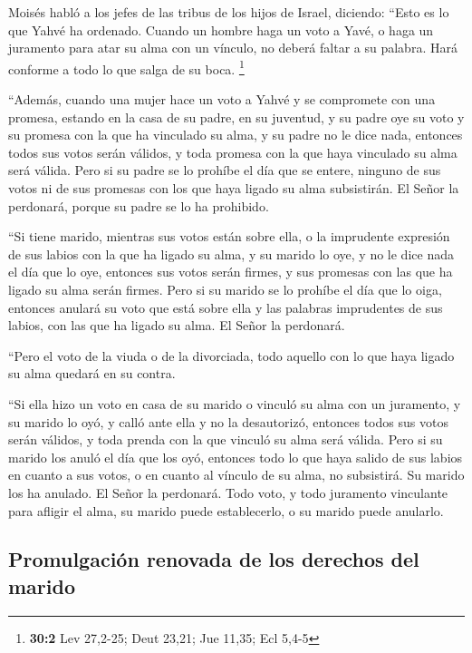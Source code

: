 \begin{paracol}{2}
 Moisés habló a los jefes de las tribus de los hijos de
Israel, diciendo: ``Esto es lo que Yahvé ha ordenado. 
Cuando un hombre haga un voto a Yavé, o haga un juramento para atar su
alma con un vínculo, no deberá faltar a su palabra. Hará conforme a todo
lo que salga de su boca. \footnote{\textbf{30:2} Lev 27,2-25; Deut
  23,21; Jue 11,35; Ecl 5,4-5}

 ``Además, cuando una mujer hace un voto a Yahvé y se
compromete con una promesa, estando en la casa de su padre, en su
juventud,  y su padre oye su voto y su promesa con la que
ha vinculado su alma, y su padre no le dice nada, entonces todos sus
votos serán válidos, y toda promesa con la que haya vinculado su alma
será válida.  Pero si su padre se lo prohíbe el día que se
entere, ninguno de sus votos ni de sus promesas con los que haya ligado
su alma subsistirán. El Señor la perdonará, porque su padre se lo ha
prohibido.

 ``Si tiene marido, mientras sus votos están sobre ella, o
la imprudente expresión de sus labios con la que ha ligado su alma,
 y su marido lo oye, y no le dice nada el día que lo oye,
entonces sus votos serán firmes, y sus promesas con las que ha ligado su
alma serán firmes.  Pero si su marido se lo prohíbe el día
que lo oiga, entonces anulará su voto que está sobre ella y las palabras
imprudentes de sus labios, con las que ha ligado su alma. El Señor la
perdonará.

 ``Pero el voto de la viuda o de la divorciada, todo
aquello con lo que haya ligado su alma quedará en su contra.

 ``Si ella hizo un voto en casa de su marido o vinculó su
alma con un juramento,  y su marido lo oyó, y calló ante
ella y no la desautorizó, entonces todos sus votos serán válidos, y toda
prenda con la que vinculó su alma será válida.  Pero si
su marido los anuló el día que los oyó, entonces todo lo que haya salido
de sus labios en cuanto a sus votos, o en cuanto al vínculo de su alma,
no subsistirá. Su marido los ha anulado. El Señor la perdonará.
 Todo voto, y todo juramento vinculante para afligir el
alma, su marido puede establecerlo, o su marido puede anularlo.

\hypertarget{promulgaciuxf3n-renovada-de-los-derechos-del-marido}{%
\subsection{Promulgación renovada de los derechos del
marido}\label{promulgaciuxf3n-renovada-de-los-derechos-del-marido}}


\end{paracol}
